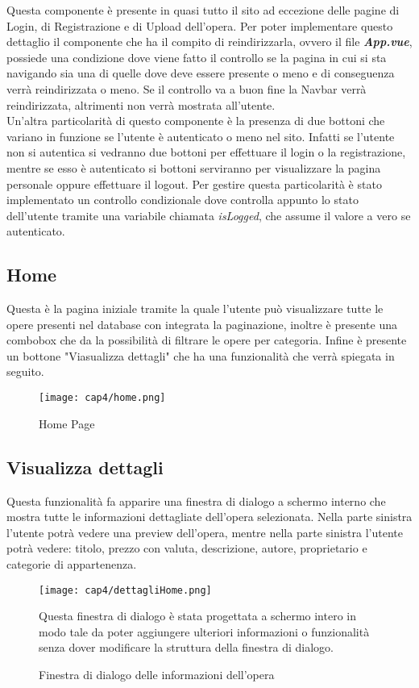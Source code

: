 Questa componente è presente in quasi tutto il sito ad eccezione delle pagine di Login, di Registrazione e di Upload dell'opera. Per poter implementare questo dettaglio il componente che ha il compito di reindirizzarla, ovvero il file \textbf{\textit{App.vue}}, possiede una condizione dove viene fatto il controllo se la pagina in cui si sta navigando sia una di quelle dove deve essere presente o meno e di conseguenza verrà reindirizzata o meno. Se il controllo va a buon fine la Navbar verrà reindirizzata, altrimenti non verrà mostrata all'utente.\\
Un'altra particolarità di questo componente è la presenza di due bottoni che variano in funzione se l'utente è autenticato o meno nel sito. Infatti se l'utente non si autentica si vedranno due bottoni per effettuare il login o la registrazione, mentre se esso è autenticato si bottoni serviranno per visualizzare la pagina personale oppure effettuare il logout. Per gestire questa particolarità è stato implementato un controllo condizionale dove controlla appunto lo stato dell'utente tramite una variabile chiamata \textit{isLogged}, che assume il valore a vero se autenticato.

\subsection{Home}
\label{subsec:home}

Questa è la pagina iniziale tramite la quale l'utente può visualizzare tutte le opere presenti nel database con integrata la paginazione, inoltre è presente una combobox che da la possibilità di filtrare le opere per categoria. Infine è presente un bottone "Viasualizza dettagli" che ha una funzionalità che verrà spiegata in seguito.
\begin{figure}[H]
	\begin{center}
		\texttt{[image: cap4/home.png]}
		\caption{Home Page}
	\end{center}
\end{figure}

\subsection{Visualizza dettagli}
\label{subsec:visualizza-dettagli}

Questa funzionalità fa apparire una finestra di dialogo a schermo interno che mostra tutte le informazioni dettagliate dell'opera selezionata. Nella parte sinistra l'utente potrà vedere una preview dell'opera, mentre nella parte sinistra l'utente potrà vedere: titolo, prezzo con valuta, descrizione, autore, proprietario e categorie di appartenenza.
\begin{figure}[H]
	\begin{center}
		\texttt{[image: cap4/dettagliHome.png]}
		\caption{Finestra di dialogo delle informazioni dell'opera}
	\end{center}
Questa finestra di dialogo è stata progettata a schermo intero in modo tale da poter aggiungere ulteriori informazioni o funzionalità senza dover modificare la struttura della finestra di dialogo.
\end{figure}

